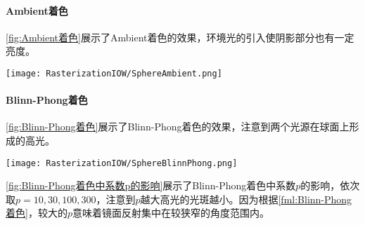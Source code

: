 \paragraph{Ambient着色}
\cref{fig:Ambient着色}展示了Ambient着色的效果，环境光的引入使阴影部分也有一定亮度。
\begin{Figure}[Ambient着色]
    \texttt{[image: RasterizationIOW/SphereAmbient.png]}
\end{Figure}

\paragraph{Blinn-Phong着色}
\cref{fig:Blinn-Phong着色}展示了Blinn-Phong着色的效果，注意到两个光源在球面上形成的高光。

\begin{Figure}
    \texttt{[image: RasterizationIOW/SphereBlinnPhong.png]}
\end{Figure}

\cref{fig:Blinn-Phong着色中系数p的影响}展示了Blinn-Phong着色中系数$p$的影响，依次取$p=10,30,100,300$，注意到$p$越大高光的光斑越小。因为根据\cref{fml:Blinn-Phong着色}，较大的$p$意味着镜面反射集中在较狭窄的角度范围内。

\begin{Figure}
\end{Figure}